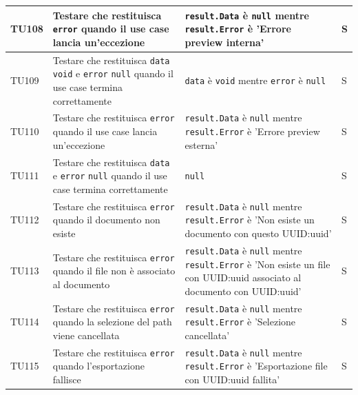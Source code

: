 \documentclass[a4paper,12pt]{article}
\begin{document}
\begin{longtable}{|M{1.2cm}|M{5cm}|M{8cm}|M{1.5cm}|}
            TU108 & Testare che \texttt{} restituisca \texttt{error} quando il use case lancia un'eccezione & \texttt{result.Data} è \texttt{null} mentre \texttt{result.Error} è 'Errore preview interna' & S \\
            \hline

            TU109 & Testare che \texttt{} restituisca \texttt{data} \texttt{void} e \texttt{error} \texttt{null} quando il use case termina correttamente & \texttt{data} è \texttt{void} mentre \texttt{error} è \texttt{null} & S \\
            \hline

            TU110 & Testare che \texttt{} restituisca \texttt{error} quando il use case lancia un'eccezione & \texttt{result.Data} è \texttt{null} mentre \texttt{result.Error} è 'Errore preview esterna' & S \\
            \hline

            TU111 & Testare che \texttt{} restituisca \texttt{data} e \texttt{error} \texttt{null} quando il use case termina correttamente & \texttt{null} & S \\
            \hline

            TU112 & Testare che \texttt{} restituisca \texttt{error} quando il documento non esiste & \texttt{result.Data} è \texttt{null} mentre \texttt{result.Error} è 'Non esiste un documento con questo UUID:uuid' & S \\
            \hline

            TU113 & Testare che \texttt{} restituisca \texttt{error} quando il file non è associato al documento & \texttt{result.Data} è \texttt{null} mentre \texttt{result.Error} è 'Non esiste un file con UUID:uuid associato al documento con UUID:uuid' & S \\
            \hline

            TU114 & Testare che \texttt{} restituisca \texttt{error} quando la selezione del path viene cancellata & \texttt{result.Data} è \texttt{null} mentre \texttt{result.Error} è 'Selezione cancellata' & S \\
            \hline

            TU115 & Testare che \texttt{} restituisca \texttt{error} quando l'esportazione fallisce & \texttt{result.Data} è \texttt{null} mentre \texttt{result.Error} è 'Esportazione file con UUID:uuid fallita' & S \\
            \hline


\end{longtable}
\end{document}
